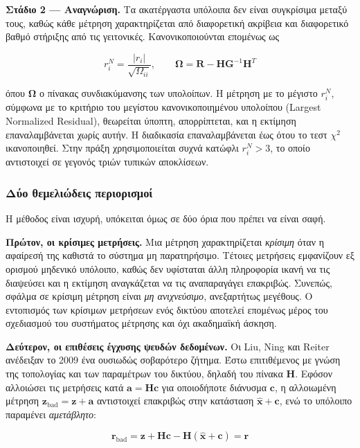 \textbf{Στάδιο 2 --- Αναγνώριση.} Τα ακατέργαστα υπόλοιπα δεν είναι συγκρίσιμα μεταξύ τους,
καθώς κάθε μέτρηση χαρακτηρίζεται από διαφορετική ακρίβεια και διαφορετικό βαθμό στήριξης
από τις γειτονικές. Κανονικοποιούνται επομένως ως

\begin{equation}
r_i^{N} = \frac{|r_i|}{\sqrt{\Omega_{ii}}}, \qquad
\boldsymbol{\Omega} = \mathbf{R} - \mathbf{H}\mathbf{G}^{-1}\mathbf{H}^{T}
\label{eq:normres}
\end{equation}

όπου $\boldsymbol{\Omega}$ ο πίνακας συνδιακύμανσης των υπολοίπων. Η μέτρηση με το μέγιστο
$r_i^{N}$, σύμφωνα με το κριτήριο του μεγίστου κανονικοποιημένου υπολοίπου (Largest
Normalized Residual), θεωρείται ύποπτη, απορρίπτεται, και η εκτίμηση επαναλαμβάνεται χωρίς
αυτήν. Η διαδικασία επαναλαμβάνεται έως ότου το τεστ $\chi^2$ ικανοποιηθεί. Στην πράξη
χρησιμοποιείται συχνά κατώφλι $r_i^{N} > 3$, το οποίο αντιστοιχεί σε γεγονός τριών τυπικών
αποκλίσεων.

\subsubsection*{Δύο θεμελιώδεις περιορισμοί}

Η μέθοδος είναι ισχυρή, υπόκειται όμως σε δύο όρια που πρέπει να είναι σαφή.

\textbf{Πρώτον, οι κρίσιμες μετρήσεις.} Μια μέτρηση χαρακτηρίζεται \emph{κρίσιμη} όταν η
αφαίρεσή της καθιστά το σύστημα μη παρατηρήσιμο. Τέτοιες μετρήσεις εμφανίζουν εξ ορισμού
μηδενικό υπόλοιπο, καθώς δεν υφίσταται άλλη πληροφορία ικανή να τις διαψεύσει και η
εκτίμηση αναγκάζεται να τις αναπαραγάγει επακριβώς. Συνεπώς, σφάλμα σε κρίσιμη μέτρηση
είναι \emph{μη ανιχνεύσιμο}, ανεξαρτήτως μεγέθους. Ο εντοπισμός των κρίσιμων μετρήσεων ενός
δικτύου αποτελεί επομένως μέρος του σχεδιασμού του συστήματος μέτρησης και όχι ακαδημαϊκή
άσκηση.

\textbf{Δεύτερον, οι επιθέσεις έγχυσης ψευδών δεδομένων.} Οι Liu, Ning και Reiter ανέδειξαν
το 2009 ένα ουσιωδώς σοβαρότερο ζήτημα. Έστω επιτιθέμενος με γνώση της τοπολογίας και των
παραμέτρων του δικτύου, δηλαδή του πίνακα $\mathbf{H}$. Εφόσον αλλοιώσει τις μετρήσεις κατά
$\mathbf{a} = \mathbf{H}\mathbf{c}$ για οποιοδήποτε διάνυσμα $\mathbf{c}$, η αλλοιωμένη
μέτρηση $\mathbf{z}_{\text{bad}} = \mathbf{z} + \mathbf{a}$ αντιστοιχεί επακριβώς στην
κατάσταση $\hat{\mathbf{x}} + \mathbf{c}$, ενώ το υπόλοιπο παραμένει \emph{αμετάβλητο}:

\begin{equation}
\mathbf{r}_{\text{bad}} = \mathbf{z} + \mathbf{H}\mathbf{c}
        - \mathbf{H}(\hat{\mathbf{x}} + \mathbf{c}) = \mathbf{r}
\label{eq:fdia}
\end{equation}

